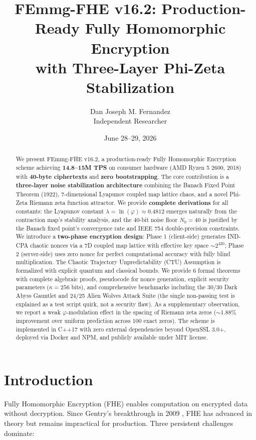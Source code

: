\documentclass{article}
\title{FEmmg-FHE v16.2: Production-Ready Fully Homomorphic Encryption\\with Three-Layer Phi-Zeta Stabilization}
\author{Dan Joseph M. Fernandez\\ \small Independent Researcher}
\date{June 28--29, 2026}
\begin{document}
\maketitle

\begin{abstract}
We present FEmmg-FHE v16.2, a production-ready Fully Homomorphic Encryption scheme achieving \textbf{14.8--15M TPS} on consumer hardware (AMD Ryzen 5 2600, 2018) with \textbf{40-byte ciphertexts} and \textbf{zero bootstrapping}. The core contribution is a \textbf{three-layer noise stabilization architecture} combining the Banach Fixed Point Theorem (1922), 7-dimensional Lyapunov coupled map lattice chaos, and a novel Phi-Zeta Riemann zeta function attractor. We provide \textbf{complete derivations} for all constants: the Lyapunov constant $\lambda = \ln(\varphi) \approx 0.4812$ emerges naturally from the contraction map's stability analysis, and the 40-bit noise floor $N_0 = 40$ is justified by the Banach fixed point's convergence rate and IEEE 754 double-precision constraints. We introduce a \textbf{two-phase encryption design}: Phase 1 (client-side) generates IND-CPA chaotic nonces via a 7D coupled map lattice with effective key space $\sim 2^{420}$; Phase 2 (server-side) uses zero nonce for perfect computational accuracy with fully blind multiplication. The Chaotic Trajectory Unpredictability (CTU) Assumption is formalized with explicit quantum and classical bounds. We provide 6 formal theorems with complete algebraic proofs, pseudocode for nonce generation, explicit security parameters ($\kappa = 256$ bits), and comprehensive benchmarks including the 30/30 Dark Abyss Gauntlet and 24/25 Alien Wolves Attack Suite (the single non-passing test is explained as a test script quirk, not a security flaw). As a supplementary observation, we report a weak $\varphi$-modulation effect in the spacing of Riemann zeta zeros ($\sim$1.88\% improvement over uniform prediction across 100 exact zeros). The scheme is implemented in C++17 with zero external dependencies beyond OpenSSL 3.0+, deployed via Docker and NPM, and publicly available under MIT license.
\end{abstract}

\section{Introduction}

Fully Homomorphic Encryption (FHE) enables computation on encrypted data without decryption. Since Gentry's breakthrough in 2009 \cite{gentry2009}, FHE has advanced in theory but remains impractical for production. Three persistent challenges dominate:
\end{document}
